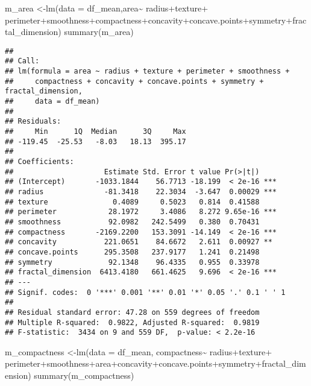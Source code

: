 \documentclass[
  11pt,
]{article}
\newenvironment{Shaded}{\begin{snugshade}}{\end{snugshade}}
\newcommand{\AttributeTok}[1]{\textcolor[rgb]{0.77,0.63,0.00}{#1}}
\newcommand{\FunctionTok}[1]{\textcolor[rgb]{0.00,0.00,0.00}{#1}}
\newcommand{\NormalTok}[1]{#1}
\newcommand{\OtherTok}[1]{\textcolor[rgb]{0.56,0.35,0.01}{#1}}
\newcommand{\SpecialCharTok}[1]{\textcolor[rgb]{0.00,0.00,0.00}{#1}}
\begin{document}
\begin{Shaded}
\begin{Highlighting}[]
\NormalTok{m\_area }\OtherTok{\textless{}{-}}\FunctionTok{lm}\NormalTok{(}\AttributeTok{data =}\NormalTok{ df\_mean,area}\SpecialCharTok{\textasciitilde{}}\NormalTok{ radius}\SpecialCharTok{+}\NormalTok{texture}\SpecialCharTok{+}\NormalTok{ perimeter}\SpecialCharTok{+}\NormalTok{smoothness}\SpecialCharTok{+}\NormalTok{compactness}\SpecialCharTok{+}\NormalTok{concavity}\SpecialCharTok{+}\NormalTok{concave.points}\SpecialCharTok{+}\NormalTok{symmetry}\SpecialCharTok{+}\NormalTok{fractal\_dimension)}
\FunctionTok{summary}\NormalTok{(m\_area)}
\end{Highlighting}
\end{Shaded}

\begin{verbatim}
## 
## Call:
## lm(formula = area ~ radius + texture + perimeter + smoothness + 
##     compactness + concavity + concave.points + symmetry + fractal_dimension, 
##     data = df_mean)
## 
## Residuals:
##     Min      1Q  Median      3Q     Max 
## -119.45  -25.53   -8.03   18.13  395.17 
## 
## Coefficients:
##                     Estimate Std. Error t value Pr(>|t|)    
## (Intercept)       -1033.1844    56.7713 -18.199  < 2e-16 ***
## radius              -81.3418    22.3034  -3.647  0.00029 ***
## texture               0.4089     0.5023   0.814  0.41588    
## perimeter            28.1972     3.4086   8.272 9.65e-16 ***
## smoothness           92.0982   242.5499   0.380  0.70431    
## compactness       -2169.2200   153.3091 -14.149  < 2e-16 ***
## concavity           221.0651    84.6672   2.611  0.00927 ** 
## concave.points      295.3508   237.9177   1.241  0.21498    
## symmetry             92.1348    96.4335   0.955  0.33978    
## fractal_dimension  6413.4180   661.4625   9.696  < 2e-16 ***
## ---
## Signif. codes:  0 '***' 0.001 '**' 0.01 '*' 0.05 '.' 0.1 ' ' 1
## 
## Residual standard error: 47.28 on 559 degrees of freedom
## Multiple R-squared:  0.9822, Adjusted R-squared:  0.9819 
## F-statistic:  3434 on 9 and 559 DF,  p-value: < 2.2e-16
\end{verbatim}

\begin{Shaded}
\begin{Highlighting}[]
\NormalTok{m\_compactness }\OtherTok{\textless{}{-}}\FunctionTok{lm}\NormalTok{(}\AttributeTok{data =}\NormalTok{ df\_mean, compactness}\SpecialCharTok{\textasciitilde{}}\NormalTok{ radius}\SpecialCharTok{+}\NormalTok{texture}\SpecialCharTok{+}\NormalTok{ perimeter}\SpecialCharTok{+}\NormalTok{smoothness}\SpecialCharTok{+}\NormalTok{area}\SpecialCharTok{+}\NormalTok{concavity}\SpecialCharTok{+}\NormalTok{concave.points}\SpecialCharTok{+}\NormalTok{symmetry}\SpecialCharTok{+}\NormalTok{fractal\_dimension)}
\FunctionTok{summary}\NormalTok{(m\_compactness)}
\end{Highlighting}
\end{Shaded}
\end{document}
